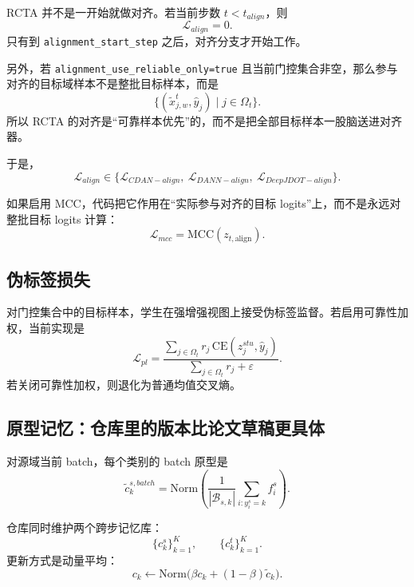 \documentclass[12pt,a4paper]{ctexart}
\newcommand{\B}{\mathcal{B}}
\begin{document}
RCTA 并不是一开始就做对齐。若当前步数 $t< t_{align}$，则
\begin{equation}
\mathcal{L}_{align}=0.
\end{equation}
只有到 \texttt{alignment\_start\_step} 之后，对齐分支才开始工作。

另外，若 \texttt{alignment\_use\_reliable\_only=true} 且当前门控集合非空，那么参与对齐的目标域样本不是整批目标样本，而是
\begin{equation}
\{(\tilde x_{j,w}^t,\hat y_j)\mid j\in \Omega_t\}.
\end{equation}
所以 RCTA 的对齐是“可靠样本优先”的，而不是把全部目标样本一股脑送进对齐器。

于是，
\begin{equation}
\mathcal{L}_{align}\in
\{\mathcal{L}_{CDAN-align},\ \mathcal{L}_{DANN-align},\ \mathcal{L}_{DeepJDOT-align}\}.
\end{equation}

如果启用 MCC，代码把它作用在“实际参与对齐的目标 logits”上，而不是永远对整批目标 logits 计算：
\begin{equation}
\mathcal{L}_{mcc}=\mathrm{MCC}(z_{t,\mathrm{align}}).
\end{equation}

\subsection{伪标签损失}

对门控集合中的目标样本，学生在强增强视图上接受伪标签监督。若启用可靠性加权，当前实现是
\begin{equation}
\mathcal{L}_{pl}
=
\frac{\sum_{j\in \Omega_t} r_j\,\mathrm{CE}(z_j^{stu},\hat y_j)}
{\sum_{j\in \Omega_t} r_j+\varepsilon}.
\end{equation}
若关闭可靠性加权，则退化为普通均值交叉熵。

\subsection{原型记忆：仓库里的版本比论文草稿更具体}

对源域当前 batch，每个类别的 batch 原型是
\begin{equation}
\tilde c_k^{s,batch}
=
\mathrm{Norm}\left(
\frac{1}{|\B_{s,k}|}
\sum_{i:y_i^s=k} f_i^s
\right).
\end{equation}

仓库同时维护两个跨步记忆库：
\begin{equation}
\{c_k^s\}_{k=1}^{K},\qquad
\{c_k^t\}_{k=1}^{K}.
\end{equation}
更新方式是动量平均：
\begin{equation}
c_k \leftarrow \mathrm{Norm}\big(\beta c_k +(1-\beta)\tilde c_k\big).
\end{equation}
\end{document}
